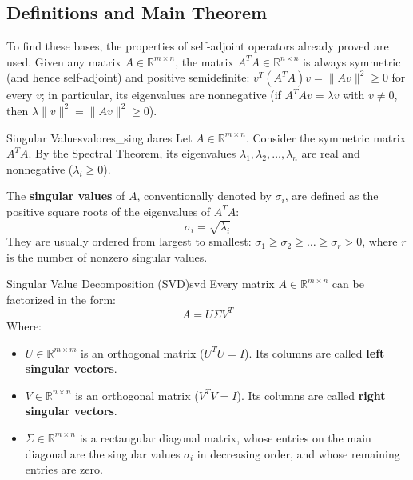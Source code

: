 \documentclass[11pt, a4paper]{article}
\begin{document}
\subsection{Definitions and Main Theorem}

To find these bases, the properties of self-adjoint operators already proved are used. Given any matrix $A \in \mathbb{R}^{m \times n}$, the matrix $A^T A \in \mathbb{R}^{n \times n}$ is always symmetric (and hence self-adjoint) and positive semidefinite: $v^T (A^T A) v = \|Av\|^2 \ge 0$ for every $v$; in particular, its eigenvalues are nonnegative (if $A^T A v = \lambda v$ with $v \neq 0$, then $\lambda \|v\|^2 = \|Av\|^2 \ge 0$).

\begin{definicion}{Singular Values}{valores_singulares}
Let $A \in \mathbb{R}^{m \times n}$. Consider the symmetric matrix $A^T A$. By the Spectral Theorem, its eigenvalues $\lambda_1, \lambda_2, \dots, \lambda_n$ are real and nonnegative ($\lambda_i \ge 0$).

The \textbf{singular values} of $A$, conventionally denoted by $\sigma_i$, are defined as the positive square roots of the eigenvalues of $A^T A$:
\[ \sigma_i = \sqrt{\lambda_i} \]
They are usually ordered from largest to smallest: $\sigma_1 \ge \sigma_2 \ge \dots \ge \sigma_r > 0$, where $r$ is the number of nonzero singular values.
\end{definicion}

\begin{teorema}{Singular Value Decomposition (SVD)}{svd}
Every matrix $A \in \mathbb{R}^{m \times n}$ can be factorized in the form:
\[ A = U \Sigma V^T \]
Where:
\begin{itemize}
    \item $U \in \mathbb{R}^{m \times m}$ is an orthogonal matrix ($U^T U = I$). Its columns are called \textbf{left singular vectors}.
    \item $V \in \mathbb{R}^{n \times n}$ is an orthogonal matrix ($V^T V = I$). Its columns are called \textbf{right singular vectors}.
    \item $\Sigma \in \mathbb{R}^{m \times n}$ is a rectangular diagonal matrix, whose entries on the main diagonal are the singular values $\sigma_i$ in decreasing order, and whose remaining entries are zero.
\end{itemize}
\end{teorema}
\end{document}
